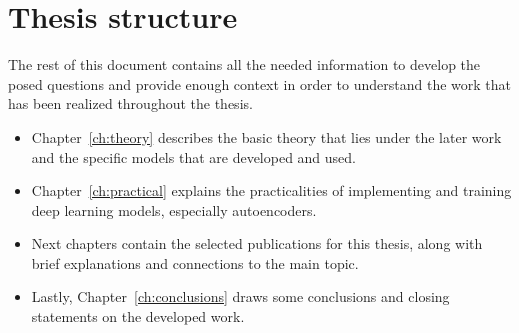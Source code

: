 \section{Thesis structure}

The rest of this document contains all the needed information to develop the posed questions and provide enough context in order to understand the work that has been realized throughout the thesis.

\begin{itemize}
    \item Chapter~\ref{ch:theory} describes the basic theory that lies under the later work and the specific models that are developed and used.
    \item Chapter~\ref{ch:practical} explains the practicalities of implementing and training deep learning models, especially autoencoders.
    \item Next chapters contain the selected publications for this thesis, along with brief explanations and connections to the main topic.
    \item Lastly, Chapter~\ref{ch:conclusions} draws some conclusions and closing statements on the developed work.
\end{itemize}